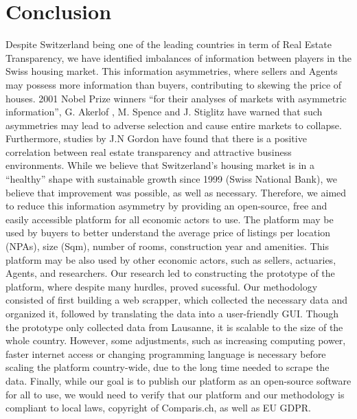 \documentclass[main]{subfiles}
\begin{document}
\section{Conclusion}
Despite Switzerland being one of the leading countries in term of Real Estate Transparency, we have identified imbalances of information between players in the Swiss housing market. This information asymmetries, where sellers and Agents may possess more information than buyers, contributing to skewing the price of houses. 
2001 Nobel Prize winners “for their analyses of markets with asymmetric information”, G. Akerlof 
\cite{akerlofMarketLemonsQuality197}, 
M. Spence \cite{spenceInformationalAspectsMarket1976} and 
J. Stiglitz \cite{stiglitzAsymmetricInformationCredit1992} 
have warned that such asymmetries may lead to adverse selection and cause entire markets to collapse. Furthermore, studies by J.N Gordon have found that there is a positive correlation between real estate transparency and attractive business environments. While we believe that Switzerland's housing market is in a “healthy” shape with sustainable growth since 1999 (Swiss National Bank), we believe that improvement was possible, as well as necessary.
Therefore, we aimed to reduce this information asymmetry by providing an open-source, free and easily accessible platform for all economic actors to use. The platform may be used by buyers to better understand the average price of listings per location (NPAs), size (Sqm), number of rooms, construction year and amenities. This platform may be also used by other economic actors, such as sellers, actuaries, Agents, and researchers.
Our research led to constructing the prototype of the platform, where despite many hurdles, proved sucessful. Our methodology consisted of first building a web scrapper, which collected the necessary data and organized it, followed by translating the data into a user-friendly GUI. Though the prototype only collected data from Lausanne, it is scalable to the size of the whole country. However, some adjustments, such as increasing computing power, faster internet access or changing programming language is necessary before scaling the platform country-wide, due to the long time needed to scrape the data. 
Finally, while our goal is to publish our platform as an open-source software for all to use, we would need to verify that our platform and our methodology is compliant to local laws, copyright of Comparis.ch, as well as EU GDPR.
\end{document}
